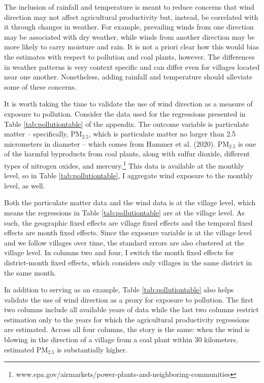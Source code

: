 \documentclass[
]{article}
\begin{document}
The inclusion of rainfall and temperature is meant to reduce concerns that wind direction may not affect agricultural productivity but, instead, be correlated with it through changes in weather. For example, prevailing winds from one direction may be associated with dry weather, while winds from another direction may be more likely to carry moisture and rain. It is not a priori clear how this would bias the estimates with respect to pollution and coal plants, however. The differences in weather patterns is very context specific and can differ even for villages located near one another. Nonetheless, adding rainfall and temperature should alleviate some of these concerns.

It is worth taking the time to validate the use of wind direction as a measure of exposure to pollution. Consider the data used for the regressions presented in Table \ref{tab:pollutiontable} of the appendix. The outcome variable is particulate matter -- specifically, \(\mathrm{PM_{2.5}}\), which is particulate matter no larger than 2.5 micrometers in diameter -- which comes from Hammer et al. (2020). \(\mathrm{PM_{2.5}}\) is one of the harmful byproducts from coal plants, along with sulfur dioxide, different types of nitrogen oxides, and mercury.\footnote{www.epa.gov/airmarkets/power-plants-and-neighboring-communities} This data is available at the monthly level, so in Table \ref{tab:pollutiontable}, I aggregate wind exposure to the monthly level, as well.

Both the particulate matter data and the wind data is at the village level, which means the regressions in Table \ref{tab:pollutiontable} are at the village level. As such, the geographic fixed effects are village fixed effects and the temporal fixed effects are month fixed effects. Since the exposure variable is at the village level and we follow villages over time, the standard errors are also clustered at the village level. In columns two and four, I switch the month fixed effects for district-month fixed effects, which considers only villages in the same district in the same month.

In addition to serving as an example, Table \ref{tab:pollutiontable} also helps validate the use of wind direction as a proxy for exposure to pollution. The first two columns include all available years of data while the last two columns restrict estimation only to the years for which the agricultural productivity regressions are estimated. Across all four columns, the story is the same: when the wind is blowing in the direction of a village from a coal plant within 30 kilometers, estimated \(\mathrm{PM_{2.5}}\) is substantially higher.
\end{document}
